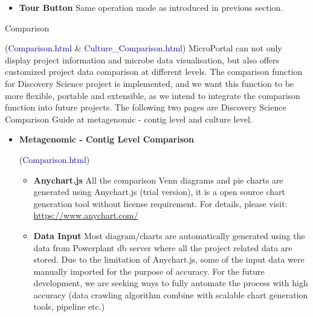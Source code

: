 \documentclass{scrreprt}
\begin{document}
\begin{enumerate}
\begin{itemize}
\begin{itemize}
\begin{figure}[h!]
    \caption{Honey Landscape Biocultural Metadata}
    \label{fig:Start Tour}
\end{figure}
\newline
\newline
        \item \textbf{Tour Button}
        \newline
        Same operation mode as introduced in previous section. 
    \end{itemize}
\end{itemize}

{\Large \item Comparison} (\textcolor{blue}{Comparison.html} \& \textcolor{blue}{Culture_Comparison.html})
\newline
\newline
MicroPortal can not only display project information and microbe data visualisation, but also offers customized project data comparison at different levels. The comparison function for Discovery Science project is implemented, and we want this function to be more flexible, portable and extensible, as we intend to integrate the comparison function into future projects. The following two pages are Discovery Science Comparison Guide at metagenomic - contig level and culture level. 
\begin{itemize}
\item \begin{large}\textbf{Metagenomic - Contig Level Comparison }\end{large}(\textcolor{blue}{Comparison.html})
\begin{itemize}
    \item \textbf{Anychart.js}
    \newline
    All the comparison Venn diagrams and pie charts are generated using Anychart.js (trial version), it is a open source chart generation tool without license requirement. For details, please visit:
    \newline
    \url{https://www.anychart.com/}
    \item \textbf{Data Input}
    \newline
    Most diagram/charts are automatically generated using the data from Powerplant db server where all the project related data are stored. 
    Due to the limitation of Anychart.js, some of the input data were manually imported for the purpose of accuracy. For the future development, we are seeking ways to fully automate the process with high accuracy (data crawling algorithm combine with scalable chart generation tools, pipeline etc.)

\end{itemize}
\end{itemize}
\end{enumerate}
\end{document}

